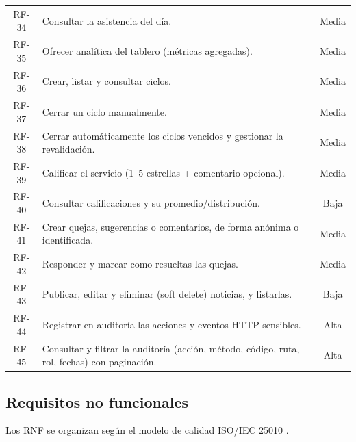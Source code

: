 \documentclass[stu,11pt,floatsintext]{apa7}
\begin{document}
\begin{longtable}{c L{0.62\textwidth} c}
RF-34 & Consultar la asistencia del día. & Media \\
RF-35 & Ofrecer analítica del tablero (métricas agregadas). & Media \\
RF-36 & Crear, listar y consultar ciclos. & Media \\
RF-37 & Cerrar un ciclo manualmente. & Media \\
RF-38 & Cerrar automáticamente los ciclos vencidos y gestionar la revalidación. & Media \\
RF-39 & Calificar el servicio (1--5 estrellas + comentario opcional). & Media \\
RF-40 & Consultar calificaciones y su promedio/distribución. & Baja \\
RF-41 & Crear quejas, sugerencias o comentarios, de forma anónima o identificada. & Media \\
RF-42 & Responder y marcar como resueltas las quejas. & Media \\
RF-43 & Publicar, editar y eliminar (soft delete) noticias, y listarlas. & Baja \\
RF-44 & Registrar en auditoría las acciones y eventos HTTP sensibles. & Alta \\
RF-45 & Consultar y filtrar la auditoría (acción, método, código, ruta, rol, fechas) con paginación. & Alta \\
\end{longtable}

\subsection{Requisitos no funcionales}
Los RNF se organizan según el modelo de calidad ISO/IEC 25010 \parencite{iso25010}.
\end{document}
